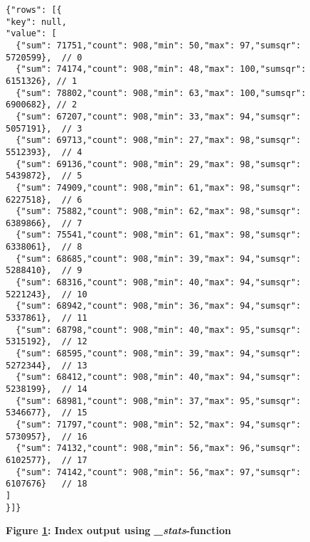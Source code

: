 \begin{figure}[H]
    \centering
    \begin{mdframed}
        \centering
        \begin{verbatim}
{"rows": [{
"key": null,    
"value": [
  {"sum": 71751,"count": 908,"min": 50,"max": 97,"sumsqr": 5720599},  // 0
  {"sum": 74174,"count": 908,"min": 48,"max": 100,"sumsqr": 6151326}, // 1
  {"sum": 78802,"count": 908,"min": 63,"max": 100,"sumsqr": 6900682}, // 2
  {"sum": 67207,"count": 908,"min": 33,"max": 94,"sumsqr": 5057191},  // 3
  {"sum": 69713,"count": 908,"min": 27,"max": 98,"sumsqr": 5512393},  // 4
  {"sum": 69136,"count": 908,"min": 29,"max": 98,"sumsqr": 5439872},  // 5
  {"sum": 74909,"count": 908,"min": 61,"max": 98,"sumsqr": 6227518},  // 6
  {"sum": 75882,"count": 908,"min": 62,"max": 98,"sumsqr": 6389866},  // 7
  {"sum": 75541,"count": 908,"min": 61,"max": 98,"sumsqr": 6338061},  // 8
  {"sum": 68685,"count": 908,"min": 39,"max": 94,"sumsqr": 5288410},  // 9
  {"sum": 68316,"count": 908,"min": 40,"max": 94,"sumsqr": 5221243},  // 10
  {"sum": 68942,"count": 908,"min": 36,"max": 94,"sumsqr": 5337861},  // 11
  {"sum": 68798,"count": 908,"min": 40,"max": 95,"sumsqr": 5315192},  // 12
  {"sum": 68595,"count": 908,"min": 39,"max": 94,"sumsqr": 5272344},  // 13
  {"sum": 68412,"count": 908,"min": 40,"max": 94,"sumsqr": 5238199},  // 14
  {"sum": 68981,"count": 908,"min": 37,"max": 95,"sumsqr": 5346677},  // 15
  {"sum": 71797,"count": 908,"min": 52,"max": 94,"sumsqr": 5730957},  // 16
  {"sum": 74132,"count": 908,"min": 56,"max": 96,"sumsqr": 6102577},  // 17
  {"sum": 74142,"count": 908,"min": 56,"max": 97,"sumsqr": 6107676}   // 18
]
}]}      
        \end{verbatim}
    \end{mdframed}
    \caption[Index output using \textit{\_stats}-function]{\textbf{Figure \ref{fig-variance-reduce-output}: Index output using \textit{\_stats}-function}}
    \label{fig-variance-reduce-output}
\end{figure}
